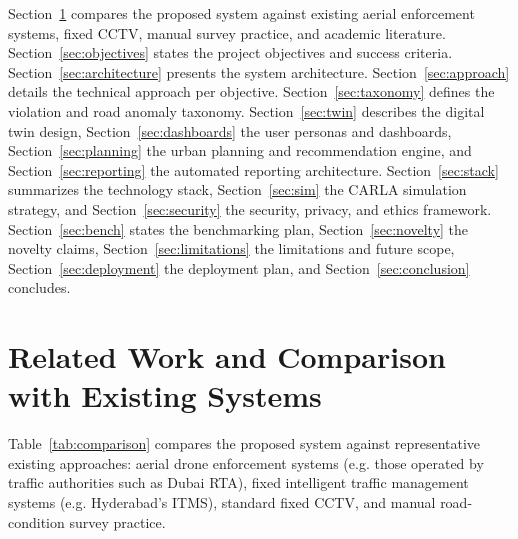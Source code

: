 \documentclass[conference]{IEEEtran}
\begin{document}
Section~\ref{sec:related} compares the proposed system against existing aerial enforcement systems, fixed CCTV, manual survey practice, and academic literature. Section~\ref{sec:objectives} states the project objectives and success criteria. Section~\ref{sec:architecture} presents the system architecture. Section~\ref{sec:approach} details the technical approach per objective. Section~\ref{sec:taxonomy} defines the violation and road anomaly taxonomy. Section~\ref{sec:twin} describes the digital twin design, Section~\ref{sec:dashboards} the user personas and dashboards, Section~\ref{sec:planning} the urban planning and recommendation engine, and Section~\ref{sec:reporting} the automated reporting architecture. Section~\ref{sec:stack} summarizes the technology stack, Section~\ref{sec:sim} the CARLA simulation strategy, and Section~\ref{sec:security} the security, privacy, and ethics framework. Section~\ref{sec:bench} states the benchmarking plan, Section~\ref{sec:novelty} the novelty claims, Section~\ref{sec:limitations} the limitations and future scope, Section~\ref{sec:deployment} the deployment plan, and Section~\ref{sec:conclusion} concludes.

\section{Related Work and Comparison with Existing Systems}
\label{sec:related}

Table~\ref{tab:comparison} compares the proposed system against representative existing approaches: aerial drone enforcement systems (e.g. those operated by traffic authorities such as Dubai RTA), fixed intelligent traffic management systems (e.g. Hyderabad's ITMS), standard fixed CCTV, and manual road-condition survey practice.
\end{document}

